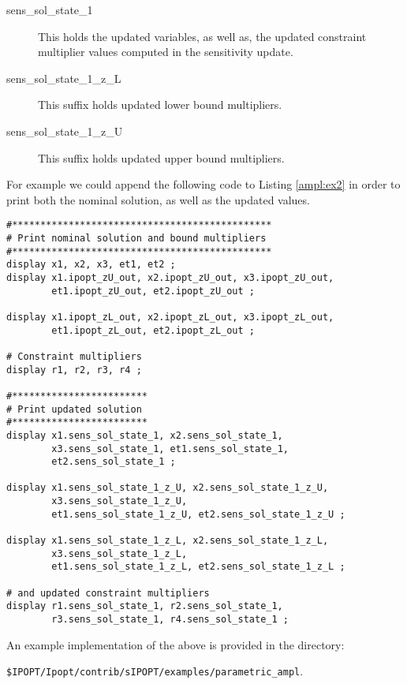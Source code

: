 \documentclass[letter, 11pt]{article}
\newcommand{\AMPL}{AMPL}
\newcommand{\ipoptf}{\$IPOPT}
\newcommand{\sensdir}{sIPOPT}
\newcommand{\sstateo}{sens\_sol\_state\_1}
\newcommand{\sstatezl}{sens\_sol\_state\_1\_z\_L}
\newcommand{\sstatezu}{sens\_sol\_state\_1\_z\_U}
\begin{document}
\begin{description}
\item[\sstateo]  This holds the updated variables, as well as, the updated constraint multiplier
                 values computed in the sensitivity update.
\item[\sstatezl] This suffix holds updated lower bound multipliers.
\item[\sstatezu] This suffix holds updated upper bound multipliers.
\end{description}

For example we could append the following code to Listing \ref{ampl:ex2} in order to print both the nominal
solution, as well as the updated values.

%
\begin{lstlisting}[language=ampl, frame=single, captionpos=b,caption={\AMPL\ code to print updated solution.}, label={ampl:ex3}]
#**********************************************
# Print nominal solution and bound multipliers
#**********************************************
display x1, x2, x3, et1, et2 ;
display x1.ipopt_zU_out, x2.ipopt_zU_out, x3.ipopt_zU_out,
        et1.ipopt_zU_out, et2.ipopt_zU_out ;

display x1.ipopt_zL_out, x2.ipopt_zL_out, x3.ipopt_zL_out,
        et1.ipopt_zL_out, et2.ipopt_zL_out ;

# Constraint multipliers
display r1, r2, r3, r4 ;

#************************
# Print updated solution
#************************
display x1.sens_sol_state_1, x2.sens_sol_state_1,
        x3.sens_sol_state_1, et1.sens_sol_state_1,
        et2.sens_sol_state_1 ;

display x1.sens_sol_state_1_z_U, x2.sens_sol_state_1_z_U,
        x3.sens_sol_state_1_z_U,
        et1.sens_sol_state_1_z_U, et2.sens_sol_state_1_z_U ;

display x1.sens_sol_state_1_z_L, x2.sens_sol_state_1_z_L,
        x3.sens_sol_state_1_z_L,
        et1.sens_sol_state_1_z_L, et2.sens_sol_state_1_z_L ;

# and updated constraint multipliers
display r1.sens_sol_state_1, r2.sens_sol_state_1,
        r3.sens_sol_state_1, r4.sens_sol_state_1 ;
\end{lstlisting}


An example implementation of the above is provided in the directory:

\begin{description}
\item {\tt \ipoptf/Ipopt/contrib/\sensdir/examples/parametric\_ampl}.
\end{description}
\end{document}
